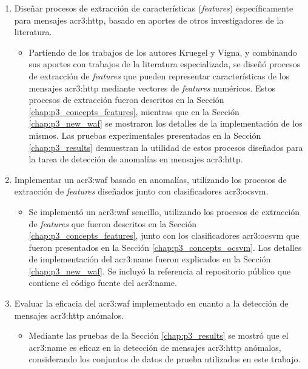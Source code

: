 \begin{enumerate}
    \item
    Diseñar procesos de extracción de características (\textit{features})
    específicamente para mensajes \gls{acr3:http}, basado en aportes de
    otros investigadores de la literatura.

    \begin{itemize}
        \item
        Partiendo de los trabajos de los autores Kruegel y Vigna, y
        combinando sus aportes con trabajos de la literatura especializada,
        se diseñó procesos de extracción de \textit{features} que pueden
        representar características de los mensajes \gls{acr3:http}
        mediante vectores de \textit{features} numéricos.
        Estos procesos de extracción fueron descritos en la Sección
        \ref{chap:p3_concepts_features}, mientras que en la Sección
        \ref{chap:p3_new_waf} se mostraron los detalles de la
        implementación de los mismos.
        Las pruebas experimentales presentadas en la Sección \ref{chap:p3_results}
        demuestran la utilidad de estos procesos diseñados para la tarea
        de detección de anomalías en mensajes \gls{acr3:http}.
    \end{itemize}

    \item
    Implementar un \gls{acr3:waf} basado en anomalías, utilizando los
    procesos de extracción de \textit{features} diseñados junto con
    clasificadores \gls{acr3:ocsvm}.

    \begin{itemize}
        \item
        Se implementó un \gls{acr3:waf} sencillo, utilizando los procesos
        de extracción de \textit{features} que fueron descritos en la Sección
        \ref{chap:p3_concepts_features}, junto con los clasificadores
        \gls{acr3:ocsvm} que fueron presentados en la Sección
        \ref{chap:p3_concepts_ocsvm}.
        Los detalles de implementación del \gls{acr3:name} fueron explicados
        en la Sección \ref{chap:p3_new_waf}. Se incluyó la referencia al
        repositorio público que contiene el código fuente del \gls{acr3:name}.
    \end{itemize}

    \item
    Evaluar la eficacia del \gls{acr3:waf} implementado en cuanto a la
    detección de mensajes \gls{acr3:http} anómalos.

    \begin{itemize}
        \item
        Mediante las pruebas de la Sección \ref{chap:p3_results} se mostró
        que el \gls{acr3:name} es eficaz en la detección de mensajes
        \gls{acr3:http} anómalos, considerando los conjuntos de datos
        de prueba utilizados en este trabajo.
    \end{itemize}


\end{enumerate}

